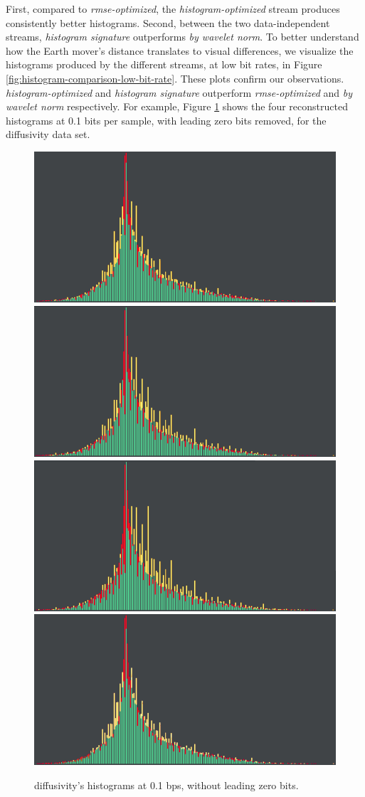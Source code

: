 First, compared to \emph{rmse-optimized}, the \emph{histogram-optimized} stream produces
consistently better histograms. Second, between the two data-independent streams, \emph{histogram
signature} outperforms \emph{by wavelet norm}. To better understand how the Earth mover's distance
translates to visual differences, we visualize the histograms produced by the different streams, at
low bit rates, in Figure \ref{fig:histogram-comparison-low-bit-rate}. These plots confirm our
observations.
\emph{histogram-optimized} and \emph{histogram signature}
outperform \emph{rmse-optimized} and \emph{by wavelet norm} respectively. For example, Figure
\ref{fig:histogram-comparison-low-bit-rate-slz} shows the four reconstructed histograms at 0.1 bits
per sample, with leading zero bits removed, for the diffusivity data set.

\begin{figure}
	\centering
	{\includegraphics[width=0.48\linewidth]{img/histogram/diffusivity/histogram.png}}
	{\includegraphics[width=0.48\linewidth]{img/histogram/diffusivity/rmse.png}}
	{\includegraphics[width=0.48\linewidth]{img/histogram/diffusivity/wavenorm.png}}
	{\includegraphics[width=0.48\linewidth]{img/histogram/diffusivity/signature.png}}
	\caption{diffusivity's histograms at 0.1 bps, without leading zero bits. }
	\label{fig:histogram-comparison-low-bit-rate-slz}
\end{figure}

